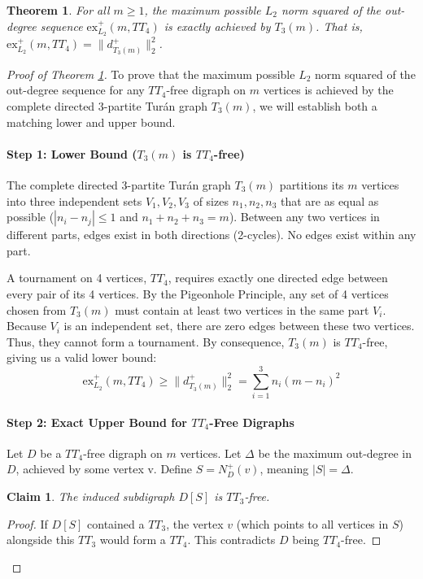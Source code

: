 \documentclass[10pt,a4paper]{amsart}
\newtheorem{theorem}{Theorem}
\newtheorem{claim}{Claim}
\begin{document}
\begin{theorem}\label{thm:tt4}
For all $m \ge 1$, the maximum possible $L_2$ norm squared of the out-degree sequence $\text{ex}^+_{L_2}(m, TT_4)$ is exactly achieved by $T_3(m)$.
That is, $\text{ex}^+_{L_2}(m, TT_4) = \|d^+_{T_3(m)}\|_2^2$.
\end{theorem}

\begin{proof}[Proof of Theorem \ref{thm:tt4}]
To prove that the maximum possible $L_2$ norm squared of the out-degree sequence for any $TT_4$-free digraph on $m$ vertices is achieved by the complete directed 3-partite Tur\'an graph $T_3(m)$,
we will establish both a matching lower and upper bound.

\paragraph{Step 1: Lower Bound ($T_3(m)$ is $TT_4$-free)}
The complete directed 3-partite Tur\'an graph $T_3(m)$ partitions its $m$ vertices into three independent sets $V_1, V_2, V_3$ of sizes $n_1, n_2, n_3$ that are as equal as possible ($|n_i - n_j| \le 1$ and $n_1+n_2+n_3=m$).
Between any two vertices in different parts, edges exist in both directions (2-cycles).
No edges exist within any part.

A tournament on 4 vertices, $TT_4$, requires exactly one directed edge between every pair of its 4 vertices.
By the Pigeonhole Principle, any set of 4 vertices chosen from $T_3(m)$ must contain at least two vertices in the same part $V_i$.
Because $V_i$ is an independent set, there are zero edges between these two vertices.
Thus, they cannot form a tournament.
By consequence, $T_3(m)$ is $TT_4$-free, giving us a valid lower bound:
\[
\text{ex}^+_{L_2}(m, TT_4) \ge \|d^+_{T_3(m)}\|_2^2 = \sum_{i=1}^3 n_i(m-n_i)^2
\]

\paragraph{Step 2: Exact Upper Bound for $TT_4$-Free Digraphs}
Let $D$ be a $TT_4$-free digraph on $m$ vertices.
Let $\Delta$ be the maximum out-degree in $D$, achieved by some vertex v.
Define $S = N^+_D(v)$, meaning $|S| = \Delta$.

\begin{claim}
The induced subdigraph $D[S]$ is $TT_3$-free.
\end{claim}

\begin{proof}
If $D[S]$ contained a $TT_3$, the vertex $v$ (which points to all vertices in $S$) alongside this $TT_3$ would form a $TT_4$.
This contradicts $D$ being $TT_4$-free.
\end{proof}


\end{proof}
\end{document}
